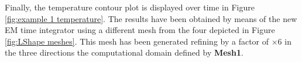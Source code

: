 Finally, the temperature contour plot is displayed over time in Figure \ref{fig:example 1 temperature}. The results have been obtained by means of the new EM time integrator using a different mesh from the four depicted in Figure \ref{fig:LShape meshes}. This mesh has been generated refining by a factor of $\times 6$ in the three directions the computational domain defined by \textbf{Mesh1}.






